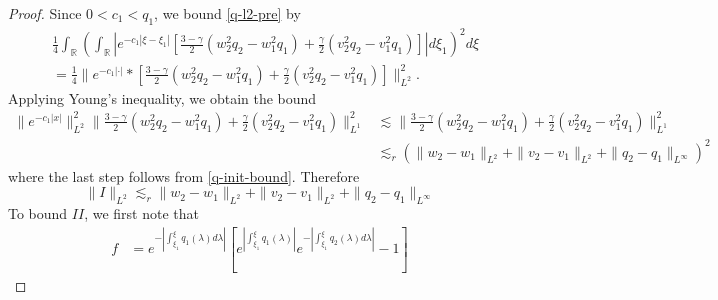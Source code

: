 \documentclass[12pt,reqno]{amsart}
\numberwithin{equation}{section}  %
\numberwithin{figure}{section}
\newcommand{\rr}{\mathbb{R}}
\begin{document}
\begin{proof}
Since $0 < c_{1} < q_{1}$, we bound \eqref{q-l2-pre} by
%
%
\begin{equation*}
\begin{split}
  & \frac{1}{4} \int_{\rr} \left( \int_{\rr} | e^{-c_{1} | \xi - \xi_{1} |} \left[ \frac{3 - \gamma}{2}(w_{2}^{2} q_{2} - w_{1}^{2}q_{1}) + \frac{\gamma}{2}(v_{2}^{2} q_{2} - v_{1}^{2} q_{1}) \right] | d \xi_{1} \right)^{2} d \xi
  \\
  & = \frac{1}{4} \| e^{-c_{1} | \cdot |} * \left[ \frac{3 - \gamma}{2}(w_{2}^{2} q_{2} - w_{1}^{2}q_{1}) + \frac{\gamma}{2}(v_{2}^{2} q_{2} - v_{1}^{2} q_{1}) \right]  \|_{L^{2}}^{2}.
\end{split}
\end{equation*}
%
Applying Young's inequality, we obtain the bound
%
%
\begin{equation*}
\begin{split}
  \| e^{-c_{1} | x |    } \|_{L^{2}}^{2} \|  \frac{3 -
  \gamma}{2}(w_{2}^{2} q_{2} - w_{1}^{2}q_{1}) + \frac{\gamma}{2}(v_{2}^{2} q_{2} -
  v_{1}^{2} q_{1})\|_{L^{1}}^{2}
  & \lesssim \|  \frac{3 -
  \gamma}{2}(w_{2}^{2} q_{2} - w_{1}^{2}q_{1}) + \frac{\gamma}{2}(v_{2}^{2} q_{2} -
  v_{1}^{2} q_{1})\|_{L^{1}}^{2}
  \\
  & \lesssim_{r}
  (\| w_{2} - w_{1} \|_{L^{2}} + \| v_{2} - v_{1} \|_{L^{2}} + \| q_{2} - q_{1} \|_{L^{\infty}})^{2}
\end{split}
\end{equation*}
%
%
where the last step follows from \eqref{q-init-bound}. Therefore
%
%
\begin{equation}
  \label{I-est}
  \| I \|_{L^{2}} \lesssim_{r} \| w_{2} - w_{1} \|_{L^{2}}+ 
  \| v_{2} - v_{1} \|_{L^{2}} + \| q_{2} - q_{1} \|_{L^{\infty}}
\end{equation}
To bound $II$, we first note that
%
%
\begin{equation*}
\begin{split}
  f & = e^{- | \int_{\xi_{1}}^{\xi} q_{1}(\lambda) d \lambda|} \left[
    e^{| \int_{\xi_{1}}^{\xi} q_{1}(\lambda) |}e^{-|
      \int_{\xi_{1}}^{\xi}q_{2}(\lambda) d \lambda |} - 1
    \right]

\end{split}
\end{equation*}
\end{proof}
\end{document}
